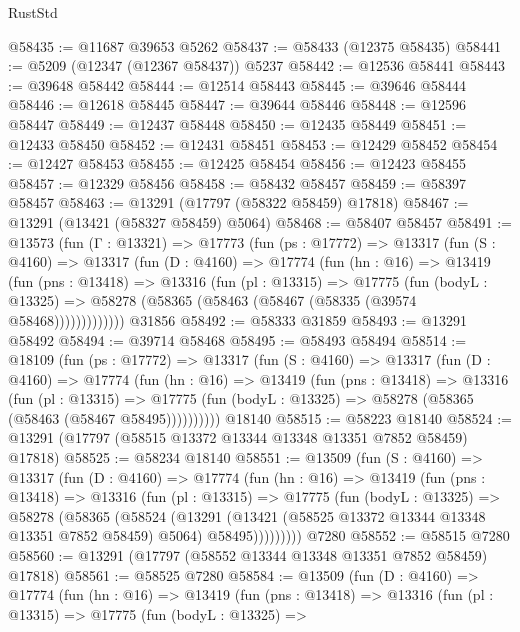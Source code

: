 \begin{lexlean}{RustStd}
\begin{coremodule}
@58435 := @11687 @39653 @5262
@58437 := @58433 (@12375 @58435)
@58441 := @5209 (@12347 (@12367 @58437)) @5237
@58442 := @12536 @58441
@58443 := @39648 @58442
@58444 := @12514 @58443
@58445 := @39646 @58444
@58446 := @12618 @58445
@58447 := @39644 @58446
@58448 := @12596 @58447
@58449 := @12437 @58448
@58450 := @12435 @58449
@58451 := @12433 @58450
@58452 := @12431 @58451
@58453 := @12429 @58452
@58454 := @12427 @58453
@58455 := @12425 @58454
@58456 := @12423 @58455
@58457 := @12329 @58456
@58458 := @58432 @58457
@58459 := @58397 @58457
@58463 := @13291 (@17797 (@58322 @58459) @17818)
@58467 := @13291 (@13421 (@58327 @58459) @5064)
@58468 := @58407 @58457
@58491 := @13573
    (fun (Γ : @13321) =>
    @17773
      (fun (ps : @17772) =>
      @13317
        (fun (S : @4160) =>
        @13317
          (fun (D : @4160) =>
          @17774
            (fun (hn : @16) =>
            @13419
              (fun (pns : @13418) =>
              @13316
                (fun (pl : @13315) =>
                @17775
                  (fun (bodyL : @13325) =>
                  @58278 (@58365 (@58463 (@58467 (@58335 (@39574 @58468)))))))))))))
    @31856
@58492 := @58333 @31859
@58493 := @13291 @58492
@58494 := @39714 @58468
@58495 := @58493 @58494
@58514 := @18109
    (fun (ps : @17772) =>
    @13317
      (fun (S : @4160) =>
      @13317
        (fun (D : @4160) =>
        @17774
          (fun (hn : @16) =>
          @13419
            (fun (pns : @13418) =>
            @13316
              (fun (pl : @13315) =>
              @17775 (fun (bodyL : @13325) => @58278 (@58365 (@58463 (@58467 @58495))))))))))
    @18140
@58515 := @58223 @18140
@58524 := @13291 (@17797 (@58515 @13372 @13344 @13348 @13351 @7852 @58459) @17818)
@58525 := @58234 @18140
@58551 := @13509
    (fun (S : @4160) =>
    @13317
      (fun (D : @4160) =>
      @17774
        (fun (hn : @16) =>
        @13419
          (fun (pns : @13418) =>
          @13316
            (fun (pl : @13315) =>
            @17775
              (fun (bodyL : @13325) =>
              @58278
                (@58365
                  (@58524
                    (@13291
                      (@13421 (@58525 @13372 @13344 @13348 @13351 @7852 @58459) @5064)
                      @58495)))))))))
    @7280
@58552 := @58515 @7280
@58560 := @13291 (@17797 (@58552 @13344 @13348 @13351 @7852 @58459) @17818)
@58561 := @58525 @7280
@58584 := @13509
    (fun (D : @4160) =>
    @17774
      (fun (hn : @16) =>
      @13419
        (fun (pns : @13418) =>
        @13316
          (fun (pl : @13315) =>
          @17775
            (fun (bodyL : @13325) =>

\end{coremodule}
\end{lexlean}
